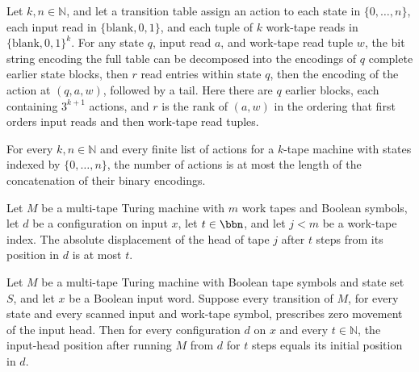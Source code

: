 \begin{lemma}
\label{Turing.StepBlock.tableBitsK_cut}
\leanok
{}
Let $k,n\in\mathbb{N}$, and let a transition table assign an action to each state in
$\{0,\ldots,n\}$, each input read in $\{\text{blank},0,1\}$, and each tuple of $k$
work-tape reads in $\{\text{blank},0,1\}^k$. For any state $q$, input read $a$, and
work-tape read tuple $w$, the bit string encoding the full table can be decomposed into
the encodings of $q$ complete earlier state blocks, then $r$ read entries within state
$q$, then the encoding of the action at $(q,a,w)$, followed by a tail. Here there are
$q$ earlier blocks, each containing $3^{k+1}$ actions, and $r$ is the rank of $(a,w)$ in
the ordering that first orders input reads and then work-tape read tuples.
\end{lemma}

\begin{lemma}
\label{Turing.StepBlock.records_length}
\leanok
{}
For every $k,n\in\mathbb N$ and every finite list of actions for a $k$-tape machine with
states indexed by $\{0,\ldots,n\}$, the number of actions is at most the length of the
concatenation of their binary encodings.
\end{lemma}

\begin{lemma}
\label{Turing.MultiTapeTM.abs_workTapePos_runFrom_sub_le}
\leanok
{}
Let $M$ be a multi-tape Turing machine with $m$ work tapes and Boolean symbols, let $d$
be a configuration on input $x$, let $t\in\bbn$, and let $j<m$ be a work-tape index. The
absolute displacement of the head of tape $j$ after $t$ steps from its position in $d$
is at most $t$.
\end{lemma}

\begin{lemma}
\label{Turing.MultiTapeTM.inputPos_runFrom_of_inputTape_eq_zero}
\leanok
{}
Let $M$ be a multi-tape Turing machine with Boolean tape symbols and state set $S$, and
let $x$ be a Boolean input word. Suppose every transition of $M$, for every state and
every scanned input and work-tape symbol, prescribes zero movement of the input head.
Then for every configuration $d$ on $x$ and every $t\in\mathbb{N}$, the input-head
position after running $M$ from $d$ for $t$ steps equals its initial position in $d$.
\end{lemma}

